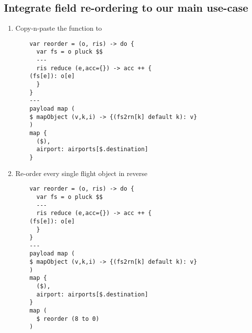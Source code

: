 \subsection{Integrate field re-ordering to our main use-case}
\begin{enumerate}[resume*]
\item Copy-n-paste the  function to 
  \begin{lstlisting}
    var reorder = (o, ris) -> do {
      var fs = o pluck $$
      ---
      ris reduce (e,acc={}) -> acc ++ {
	(fs[e]): o[e] 
      }
    }
    ---
    payload map (
    $ mapObject (v,k,i) -> {(fs2rn[k] default k): v}
    )
    map {
      ($),
      airport: airports[$.destination]
    }
  \end{lstlisting}
\item Re-order every single flight object in reverse
  \begin{lstlisting}
    var reorder = (o, ris) -> do {
      var fs = o pluck $$
      ---
      ris reduce (e,acc={}) -> acc ++ {
	(fs[e]): o[e] 
      }
    }
    ---
    payload map (
    $ mapObject (v,k,i) -> {(fs2rn[k] default k): v}
    )
    map {
      ($),
      airport: airports[$.destination]
    }
    map (
      $ reorder (8 to 0)
    )
  \end{lstlisting}
\end{enumerate}
